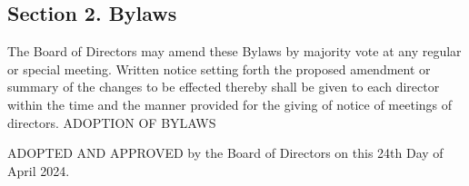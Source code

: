 \documentclass[a4paper]{article}
\begin{document}
\subsection*{Section 2. Bylaws}

The Board of Directors may amend these Bylaws by majority vote at any regular or special meeting. Written notice setting forth the proposed amendment or summary of the changes to be effected thereby shall be given to each director within the time and the manner provided for the giving of notice of meetings of directors.
ADOPTION OF BYLAWS

ADOPTED AND APPROVED by the Board of Directors on this 24th Day of April 2024.
\end{document}

